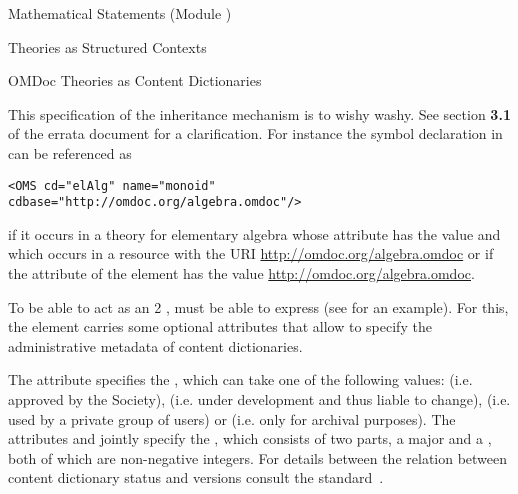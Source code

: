 \begin{tchapter}[id=statements,short=Mathematical Statements]{Mathematical Statements (Module {})}
\begin{tsection}[id=theories]{Theories as Structured Contexts}
\begin{tsubsection}[id=identifying]{OMDoc Theories as Content Dictionaries}
\begin{erratum}[reported-by=Michael Kohlhase,date=2008-09-25,type=clarification]{This
      specification of the inheritance mechanism is to wishy washy. See section
      {\textbf{3.1}} of the errata document for a clarification.}
  For instance the symbol declaration in {} can be referenced as
\begin{lstlisting}
<OMS cd="elAlg" name="monoid" cdbase="http://omdoc.org/algebra.omdoc"/>
\end{lstlisting}
  if it occurs in a theory for elementary algebra whose
  {} attribute has the value {} and
  which occurs in a resource with the URI \url{http://omdoc.org/algebra.omdoc} or if the
  {} attribute of the {} element has the value
  \url{http://omdoc.org/algebra.omdoc}.
\end{erratum}
To be able to act as an {\openmath}2 {}, {\omdoc} must
be able to express {} (see {} for an
example). For this, the {} element carries some optional attributes that
allow to specify the administrative metadata of {\openmath} content dictionaries.

The {} attribute specifies the {}, which can take one of the following values:
{} (i.e. approved by the {\openmath} Society),
{} (i.e. under development and thus liable to
change), {} (i.e. used by a private group of {\openmath}
users) or {} (i.e. only for archival purposes). The
attributes {} and {} jointly
specify the {}, which consists of two parts, a
major {} and a {}, both of which are non-negative
integers. For details between the relation between content dictionary status and versions
consult the {\openmath} standard~\cite{BusCapCar:2oms04}.


\end{tsubsection}
\end{tsection}
\end{tchapter}
